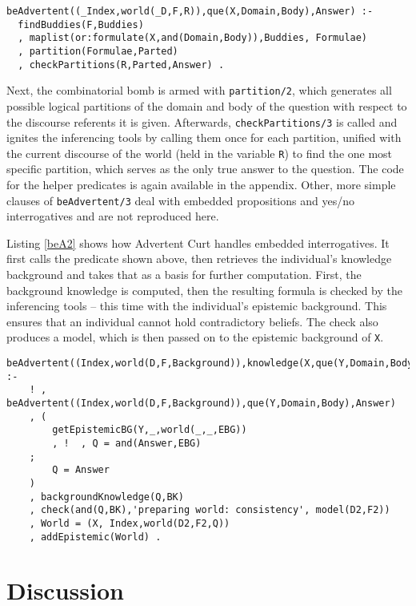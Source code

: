\documentclass[notitlepage,twoside,a4paper]{scrreprt}
\newcommand{\code}[1]{\texttt{#1}} %
\newcommand{\pn}{\textsf} %
\newcommand{\acurt}{\pn{Advertent Curt}}
\theoremstyle{remark}
\theoremstyle{remark}
\theoremstyle{definition}
\theoremstyle{definition}
\begin{document}
\begin{lstlisting}[label=beAdvertent,caption={The Core of Advertent Curt Dealing
  with Constituent Interrogatives},float]
beAdvertent((_Index,world(_D,F,R)),que(X,Domain,Body),Answer) :-
  findBuddies(F,Buddies)
  , maplist(or:formulate(X,and(Domain,Body)),Buddies, Formulae)
  , partition(Formulae,Parted)
  , checkPartitions(R,Parted,Answer) .
\end{lstlisting}

Next, the combinatorial bomb is armed with \code{partition/2}, which generates
all possible logical partitions of the domain and body of the question with
respect to the discourse referents it is given. Afterwards,
\code{checkPartitions/3} is called and ignites the inferencing tools by calling
them once for each partition, unified with the current discourse of the world
(held in the variable \code{R}) to find the one most specific partition, which
serves as the only true answer to the question.
The code for the helper predicates is again available in the appendix. Other,
more simple clauses of \code{beAdvertent/3} deal with embedded propositions and
yes/no interrogatives and are not reproduced here.

Listing \ref{beA2} shows how \acurt{} handles embedded interrogatives. It first
calls the predicate shown above, then retrieves the individual's knowledge
background and takes that as a basis for further computation. First, the
background knowledge is computed, then the resulting formula is checked by the
inferencing tools -- this time with the individual's epistemic background. This
ensures that an individual cannot hold contradictory beliefs. The check also
produces a model, which is then passed on to the epistemic background of
\code{X}.

\begin{lstlisting}[label=beA2,caption={Treatment of Embedded Interrogatives of
  Knowledge},float]
beAdvertent((Index,world(D,F,Background)),knowledge(X,que(Y,Domain,Body))) :-
	! , beAdvertent((Index,world(D,F,Background)),que(Y,Domain,Body),Answer)
	, (
		getEpistemicBG(Y,_,world(_,_,EBG))
		, !  , Q = and(Answer,EBG)
	;
		Q = Answer
	)
	, backgroundKnowledge(Q,BK)
	, check(and(Q,BK),'preparing world: consistency', model(D2,F2))
	, World = (X, Index,world(D2,F2,Q))
	, addEpistemic(World) .
\end{lstlisting}

\chapter{Discussion}\label{sec:discussion}
\end{document}
